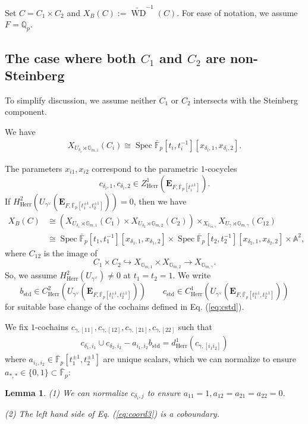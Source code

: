 \documentclass[11pt]{amsart}
\newcommand{\MINOREDITED}[1]{#1}
\newtheorem{lem}[thm]{Lemma}
\theoremstyle{definition}
\newcommand{\Q}{\mathbb{Q}}
\newcommand{\G}{\mathbb{G}}
\newcommand{\A}{\mathbb{A}}
\newcommand{\bfE}{\mathbf{E}}
\newcommand{\wt}[1]{\widetilde{#1}}
\newcommand{\bFp}{\bar{\mathbb{F}}_p}
\DeclareMathOperator{\std}{std}
\DeclareMathOperator{\WD}{WD}
\DeclareMathOperator{\Spec}{Spec}
\newcommand{\Herr}{\mathrm{Herr}}
\begin{document}
Set $C=C_1\times C_2$
and $X_B(C):=\wt\WD^{-1}(C)$.
For ease of notation, we assume
$F=\Q_p$.

\subsection{The case where both $C_1$ and $C_2$ are non-Steinberg}
To simplify discussion,
we assume neither $C_1$ or $C_2$ intersects with
the Steinberg component.

We have
\begin{align*}
X_{U_{\delta_i}\rtimes \G_{m,i}}(C_i)
\cong
\Spec \bFp[t_i, t_{i}^{-1}][x_{\delta_i,1}, x_{\delta_i,2}].
\end{align*}

The parameters $x_{i1}, x_{i2}$ correspond to
the parametric $1$-cocycles
\[
c_{\delta_i,1}, c_{\delta_i,2}\in Z^1_{\Herr}(\bfE_{F, \bFp[t_i^{\pm1}]}).
\]
If $H^2_{\Herr}(U_{\gamma^\vee}(\bfE_{F, \bFp[t_1^{\pm1},t_2^{\pm1}]}))=0$,
then we have
\begin{align*}
X_B(C)
&\cong
(X_{U_{\delta_1}\rtimes \G_{m,1}}(C_1)
\times
X_{U_{\delta_2}\rtimes \G_{m,2}}(C_2))
\times_{X_{\G_{m,\gamma}}}X_{U_{\gamma}\rtimes \G_{m,\gamma}}(C_{12})
\\
&\cong
\Spec \bFp[t_1, t_{1}^{-1}][x_{\delta_1,1}, x_{\delta_1,2}]\times
\Spec \bFp[t_2, t_{2}^{-1}][x_{\delta_2,1}, x_{\delta_2,2}]
\times \A^2,
\end{align*}
where $C_{12}$ is the image
of
\[
C_1\times C_2\hookrightarrow
X_{\G_{m,1}}\times X_{\G_{m,2}}
\to X_{\G_{m,\gamma}}.
\]
So, we assume $H^2_{\Herr}(U_{\gamma^\vee})\neq 0$
at $t_1=t_2=1$.
We write
\[
b_{\std}\in C^2_{\Herr}(U_{\gamma^\vee}(\bfE_{F,\bFp[t_1^{\pm1},t_2^{\pm1}]}))
\qquad
c_{\std}\in C^1_{\Herr}(U_{\gamma^\vee}(\bfE_{F,\bFp[t_1^{\pm1},t_2^{\pm1}]}))
\]
for suitable base change of the cochains defined in
Eq. (\ref{eq:cstd}).

We fix $1$-\MINOREDITED{cochains}
$c_{\gamma,[11]}, c_{\gamma,[12]},c_{\gamma,[21]}, c_{\gamma,[22]}$
such that
\begin{align}
\label{eq:coord3}
c_{\delta_1,i_1}\cup c_{\delta_2,i_2}
-a_{i_1,i_2}b_{\std} = d^1_{\Herr}(c_{\gamma,[i_1i_2]})
\end{align}
where $a_{i_1,i_2}\in\bFp[t_1^{\pm1}, t_2^{\pm1}]$
are unique scalars, which we can normalize
to ensure $a_{*,*}\in\{0,1\}\subset \bFp$:

\begin{lem}
\rm
(1)
We can normalize $c_{\delta_i,j}$
to ensure $a_{11}=1, a_{12}=a_{21}=a_{22}=0$.

(2)
The left hand side of Eq. (\ref{eq:coord3})
is a coboundary.
\end{lem}
\end{document}
